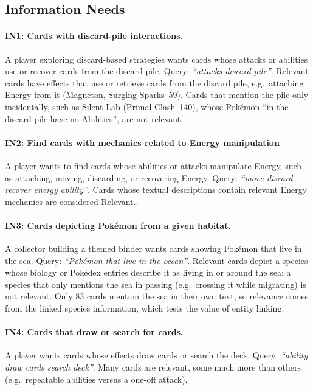 \documentclass[sigconf]{acmart}
\begin{document}
  \subsection{Information Needs}

  \paragraph{IN1: Cards with discard-pile interactions.}
  A player exploring discard-based strategies wants cards whose attacks or
  abilities use or recover cards from the discard pile. Query:
  \textit{``attacks discard pile''}. Relevant cards have effects that use
  or retrieve cards from the discard pile, e.g.\ attaching Energy from it
  (Magneton, Surging Sparks~59). Cards that mention the pile only
  incidentally, such as Silent Lab (Primal Clash~140), whose Pok\'emon ``in
  the discard pile have no Abilities'', are not relevant.

  \paragraph{IN2: Find cards with mechanics related to Energy manipulation}
  A player wants to find cards whose abilities or attacks manipulate Energy, such as attaching, moving, discarding, or recovering Energy. Query: \textit{``move discard recover energy ability''}. Cards whose textual descriptions contain relevant Energy mechanics are considered Relevant..

  \paragraph{IN3: Cards depicting Pok\'emon from a given habitat.}
  A collector building a themed binder wants cards showing Pok\'emon that
  live in the sea. Query: \textit{``Pok\'emon that live in the ocean''}.
  Relevant cards depict a species whose biology or Pok\'edex entries
  describe it as living in or around the sea; a species that only mentions
  the sea in passing (e.g.\ crossing it while migrating) is not relevant.
  Only 83 cards mention the sea in their own text, so relevance comes from
  the linked species information, which tests the value of entity linking.

  \paragraph{IN4: Cards that draw or search for cards.}
  A player wants cards whose effects draw cards or search the deck. Query:
  \textit{``ability draw cards search deck''}. Many cards are relevant, some
  much more than others (e.g.\ repeatable abilities versus a one-off attack).
\end{document}
